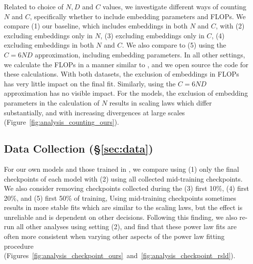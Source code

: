 Related to choice of $N, D$ and $C$ values, we investigate different ways of counting $N$ and $C$, specifically whether to include embedding parameters and FLOPs. We compare (1) our baseline, which includes embeddings in both $N$ and $C$, with (2) excluding embeddings only in $N$, (3) excluding embeddings only in $C$, (4) excluding embeddings in both $N$ and $C$. We also compare to (5) using the $C=6ND$ approximation, including embedding parameters. In all other settings, we calculate the FLOPs in a manner similar to \citet{hoffmann2022training}, and we open source the code for these calculations.
With both datasets, the exclusion of embeddings in FLOPs has very little impact on the final fit. Similarly, using the $C=6ND$ approximation has no visible impact. For the \citet{porian2024resolving} models, the exclusion of embedding parameters in the calculation of $N$ results in scaling laws which differ substantially, and with increasing divergences at large scales (Figure~\ref{fig:analysis_counting_ours}). 

\subsection{Data Collection (\S\ref{sec:data})} \label{sec:repl-data}


For our own models and those trained in \citet{porian2024resolving}, we compare using (1) only the final checkpoints of each model with (2) using all collected mid-training checkpoints. We also consider removing checkpoints collected during the (3) first 10\%, (4) first 20\%, and (5) first 50\% of training,
Using mid-training checkpoints sometimes results in more stable fits which are similar to the \citet{hoffmann2022training} scaling laws, but the effect is unreliable and is dependent on other decisions.  Following this finding, we also re-run all other analyses using setting (2), and find that these power law fits are often more consistent when varying other aspects of the power law fitting procedure (Figures~\ref{fig:analysis_checkpoint_ours}~and~\ref{fig:analysis_checkpoint_rsld}).

